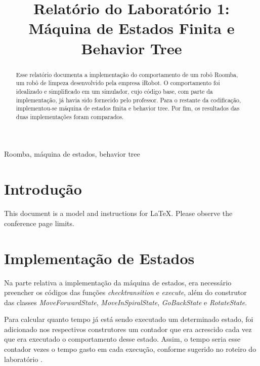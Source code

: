 \documentclass[conference]{IEEEtran}
\begin{document}
\title{Relatório do Laboratório 1: \\ Máquina de Estados Finita e Behavior Tree\\
}

\author{
}

\maketitle

\begin{abstract}
Esse relatório documenta a implementação do comportamento de um robô Roomba, um robô de limpeza desenvolvido pela empresa iRobot. O comportamento foi idealizado e simplificado em um simulador, cujo código base, com parte da implementação, já havia sido fornecido pelo professor. Para o restante da codificação, implementou-se máquina de estados finita e behavior tree. Por fim, os resultados das duas implementações foram comparados.
\end{abstract}

\begin{IEEEkeywords}
Roomba, máquina de estados, behavior tree
\end{IEEEkeywords}

\section{Introdução}
This document is a model and instructions for \LaTeX.
Please observe the conference page limits. 

\section{Implementação de Estados}
Na parte relativa a implementação da máquina de estados, era necessário preencher os códigos das funções \textit{check\underline{\space}transition} e \textit{execute}, além do construtor das classes \textit{MoveForwardState}, \textit{MoveInSpiralState}, \textit{GoBackState} e \textit{RotateState}.

Para calcular quanto tempo já está sendo executado um determinado estado, foi adicionado nos respectivos construtores um contador que era acrescido cada vez que era executado o comportamento desse estado. Assim, o tempo seria esse contador vezes o tempo gasto em cada execução, conforme sugerido no roteiro do laboratório \cite{b1}.
\end{document}
